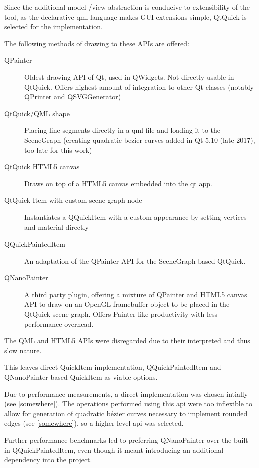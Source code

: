 Since the additional model-/view abstraction is conducive to extensibility of the tool, as the declarative \gls{qml} language makes GUI extensions simple, QtQuick is selected for the implementation.


The following methods of drawing to these APIs are offered:
\begin{description}
	\item [QPainter] Oldest drawing API of Qt, used in QWidgets. Not directly usable in QtQuick. Offers highest amount of integration to other Qt classes (notably QPrinter and QSVGGenerator)
	\item [QtQuick/QML shape] Placing line segments directly in a \gls{qml} file and loading it to the SceneGraph (creating quadratic bezier curves added in Qt 5.10 (late 2017), too late for this work)
	\item [QtQuick HTML5 canvas] Draws on top of a HTML5 canvas embedded into the qt app.
	\item [QtQuick Item with custom scene graph node] Instantiates a QQuickItem with a custom appearance by setting vertices and material directly
	\item [QQuickPaintedItem] An adaptation of the QPainter API for the SceneGraph based QtQuick. 
	\item [QNanoPainter] A third party plugin, offering a mixture of QPainter and HTML5 canvas API to draw on an OpenGL framebuffer object to be placed in the QtQuick scene graph. Offers Painter-like productivity with less performance overhead.
\end{description}

The QML and HTML5 APIs were disregarded due to their interpreted and thus slow nature.

This leaves direct QuickItem implementation, QQuickPaintedItem and QNanoPainter-based QuickItem as viable options.

Due to performance measurements, a direct implementation was chosen intially (see \ref{somewhere}). The operations performed using this \gls{api} were too inflexible to allow for generation of quadratic bézier curves necessary to implement rounded edges (see \ref{somewhere}), so a higher level \gls{api} was selected.

Further performance benchmarks led to preferring QNanoPainter over the built-in QQuickPaintedItem, even though it meant introducing an additional dependency into the project.

